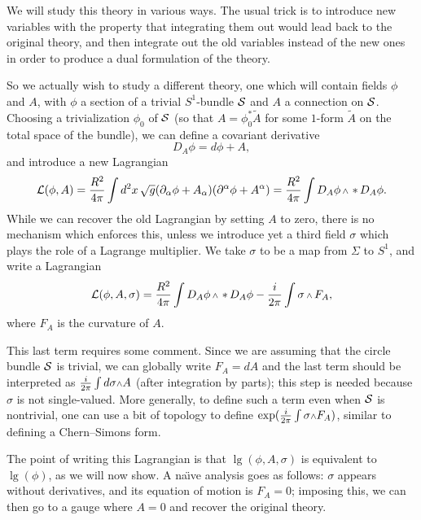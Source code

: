We will study this theory in various ways.
The usual trick is to introduce new variables with the
property that
integrating them out would lead back to the original theory, and then integrate
out the old variables instead of the new ones in order to produce a dual
formulation of the theory.

So we actually wish to study a different theory, one which will contain fields
$\phi$ and $A$, with $\phi$ a section of a trivial $S^1$-bundle ${\cal S}$ and $A$
a connection
on ${\cal S}$.  Choosing a trivialization $\phi_0$ of ${\cal S}$ (so that
$A=\phi_0^*\tilde{A}$ for some $1$-form $\tilde{A}$
on the total space of the bundle), we can define a
covariant derivative
\begin{equation}
D_A\phi = d\phi + A ,
\end{equation}
and introduce a new Lagrangian
\begin{equation}
\lg(\phi,A)=\frac{R^2}{4\pi}\int d^2x\,\sqrt{g}(\partial_\alpha\phi +
A_\alpha)(\partial^\alpha\phi + A^\alpha) =
\frac{R^2}{4\pi}\int D_A\phi\wdg\hstar D_A\phi.
\end{equation}
While we can recover the old Lagrangian by setting $A$ to zero, there is no
mechanism which enforces this, unless we introduce yet a third field $\sigma$
which plays the role of a Lagrange multiplier.  We take $\sigma$ to be a map
from $\Sigma$ to $S^1$, and write a Lagrangian
\begin{equation}
\lg(\phi,A,\sigma)=\frac{R^2}{4\pi}\int D_A\phi\wdg\hstar D_A\phi
-\frac{i}{2\pi}\int \sigma\wdg F_A,
\end{equation}
where $F_A$ is the curvature of $A$.

This last term requires some comment.  Since we are assuming that the circle
bundle ${\cal S}$ is
trivial, we can globally write $F_A=dA$ and the last term should be interpreted
as $\frac{i}{2\pi}\int d\sigma \wdg A$ (after integration by parts); this
step is needed because $\sigma$ is not single-valued.  More
generally, to
define such a term even when ${\cal S}$ is nontrivial, one can use a bit of
topology to define $\exp(\frac{i}{2\pi}\int\sigma\wdg F_A)$, similar to
defining a Chern--Simons form.

The point of writing this Lagrangian is that $\lg(\phi,A,\sigma)$ is equivalent
to $\lg(\phi)$, as we will now show.  A na\"{\i}ve analysis goes as follows:
$\sigma$ appears without derivatives, and its equation of motion is
$F_A=0$; imposing this, we can then go to a gauge where $A=0$ and recover
the original theory.

